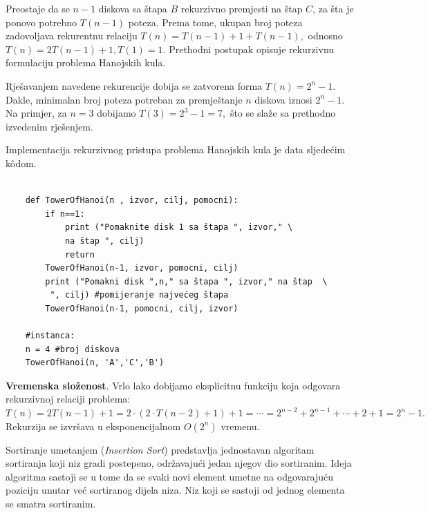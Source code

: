 \begin{solution}
	Preostaje da se $n-1$ diskova sa štapa $B$ rekurzivno premjesti na štap $C$, za šta je ponovo potrebno $T(n-1)$ poteza.  	Prema tome, ukupan broj poteza zadovoljava rekurentnu relaciju $ T(n)=T(n-1)+1+T(n-1),$  odnosno	$	T(n)=2T(n-1)+1, 	T(1)=1.$ Prethodni postupak opisuje rekurzivnu formulaciju problema Hanojskih kula.
	
	Rješavanjem navedene rekurencije dobija se zatvorena forma $T(n)=2^n-1.$	Dakle, minimalan broj poteza potreban za premještanje $n$ diskova iznosi 	$2^n-1.$ Na primjer, za $n=3$ dobijamo $T(3)=2^3-1=7,$ što se slaže sa prethodno izvedenim rješenjem.
\end{solution}

Implementacija rekurzivnog pristupa problema Hanojskih kula je data sljedećim k\^odom. 

\begin{verbatim}
	 
	def TowerOfHanoi(n , izvor, cilj, pomocni):
	    if n==1:
	        print ("Pomaknite disk 1 sa štapa ", izvor," \ 
	        na štap ", cilj)
	        return
	    TowerOfHanoi(n-1, izvor, pomocni, cilj)
	    print ("Pomakni disk ",n," sa štapa ", izvor," na štap  \ 
	     ", cilj) #pomijeranje najvećeg štapa
	    TowerOfHanoi(n-1, pomocni, cilj, izvor)
	
	#instanca:
	n = 4 #broj diskova
	TowerOfHanoi(n, 'A','C','B')
\end{verbatim} 

\textbf{Vremenska složenost}. Vrlo lako dobijamo eksplicitnu funkciju koja odgovara   rekurzivnoj relaciji problema: $T(n)= 2  T(n-1) + 1 = 2 \cdot ( 2 \cdot T(n-2) + 1) + 1 = \cdots = 2^{n-2} + 2^{n-1} + \cdots + 2 + 1 = 2^n -1.$
Rekurzija se izvršava u eksponencijalnom $O(2^n)$ vremenu.   
	
 

\begin{example}
  
     Sortiranje umetanjem (\emph{Insertion Sort}) predstavlja jednostavan algoritam
     sortiranja koji niz gradi postepeno, održavajući   jedan njegov dio sortiranim. Ideja algoritma sastoji se u tome da se  svaki novi element umetne na odgovarajuću poziciju unutar već sortiranog dijela niza. Niz koji se sastoji od jednog elementa se smatra sortiranim. 
 \end{example}
 
